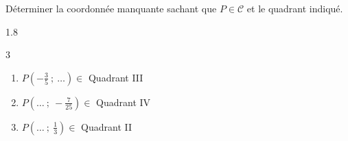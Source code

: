 \documentclass[main.tex]{subfiles}
\begin{document}
\begin{exercise} Déterminer la coordonnée manquante sachant que $P\in\mathscr{C}$ et le quadrant indiqué.
\vspace{-0.5em}
\begin{spacing}{1.8}
\begin{multicols}{3} 
\begin{enumerate}[label={\arabic*)},leftmargin=*]
\item $P(-\tfrac{3}{5}~;~\ldots) \in$ Quadrant \RN{3}
\item  $P(\ldots~;~-\tfrac{7}{25}) \in$ Quadrant \RN{4}
\item  $P(\ldots~;~\tfrac{1}{3})  \in$ Quadrant \RN{2}
\end{enumerate}
\end{multicols}\vspace{-2em}
\end{spacing}	
\end{exercise}
\end{document}
